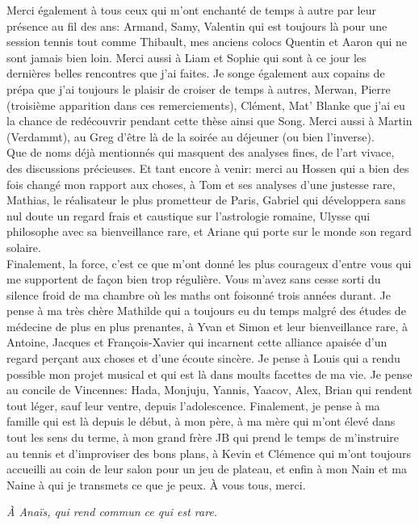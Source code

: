 Merci également à tous ceux qui m'ont enchanté de temps à autre par leur présence au fil des ans: Armand, Samy, Valentin qui est toujours là pour une session tennis tout comme Thibault, mes anciens colocs Quentin et Aaron qui ne sont jamais bien loin. Merci aussi à Liam et Sophie qui sont à ce jour les dernières belles rencontres que j'ai faites.
Je songe également aux copains de prépa que j'ai toujours le plaisir de croiser de temps à autres, Merwan, Pierre (troisième apparition dans ces remerciements), Clément, Mat' Blanke que j'ai eu la chance de redécouvrir pendant cette thèse ainsi que Song. Merci aussi à Martin (Verdammt), au Greg d'être là de la soirée au déjeuner (ou bien l'inverse).\\  
Que de noms déjà mentionnés qui masquent des analyses fines, de l'art vivace, des discussions précieuses. Et tant encore à venir: merci au Hossen qui a bien des fois changé mon rapport aux choses, à Tom et ses analyses d'une justesse rare, Mathias, le réalisateur le plus prometteur de Paris, Gabriel qui développera sans nul doute un regard frais et caustique sur l'astrologie romaine, Ulysse qui philosophe avec sa bienveillance rare, et Ariane qui porte sur le monde son regard solaire.\\
Finalement, la force, c'est ce que m'ont donné les plus courageux d'entre vous qui me supportent de façon bien trop régulière. Vous m'avez sans cesse sorti du silence froid de ma chambre où les maths ont foisonné trois années durant. Je pense à ma très chère Mathilde qui a toujours eu du temps malgré des études de médecine de plus en plus prenantes, à Yvan et Simon et leur bienveillance rare, à Antoine, Jacques et François-Xavier qui incarnent cette alliance apaisée d'un regard perçant aux choses et d'une écoute sincère. Je pense à Louis qui a rendu possible mon projet musical et qui est là dans moults facettes de ma vie. Je pense au concile de Vincennes: Hada, Monjuju, Yannis, Yaacov, Alex, Brian qui rendent tout léger, sauf leur ventre, depuis l'adolescence. Finalement, je pense à ma famille qui est là depuis le début, à mon père, à ma mère qui m'ont élevé dans tout les sens du terme, à mon grand frère JB qui prend le temps de m'instruire au tennis et d'improviser des bons plans, à Kevin et Clémence qui m'ont toujours accueilli au coin de leur salon pour un jeu de plateau, et enfin à mon Nain et ma Naine à qui je transmets ce que je peux. À vous tous, merci.

\newpage
\textit{À Anaïs, qui rend commun ce qui est rare.}